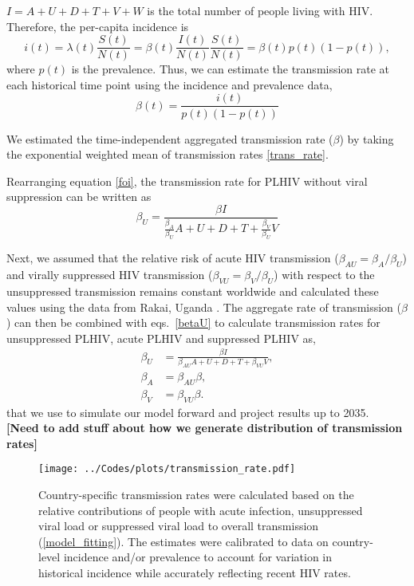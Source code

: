 \documentclass{article}
\newcommand{\comment}[1]{\textbf{[#1]}}
\begin{document}
$I = A+U+D+T+V+W$ is the total number of people living with HIV. Therefore, the per-capita
incidence is
\begin{equation}
i(t) = \lambda(t) \frac{S(t)}{N(t)}
= \beta(t) \frac{I(t)}{N(t)} \frac{S(t)}{N(t)} =\beta(t) p(t) (1-p(t)),
\end{equation}
where $p(t)$ is the prevalence. Thus, we can estimate the
transmission rate at each historical time point using the incidence
and prevalence data,
\begin{equation}
  \label{trans_rate}
  \beta(t) = \frac{i(t)}{p(t)(1-p(t))}
\end{equation}


We estimated the time-independent aggregated transmission rate ($\beta$)
by taking the exponential weighted mean of transmission rates
\eqref{trans_rate}.


Rearranging equation \eqref{foi}, the transmission rate for PLHIV
without viral suppression can be written as
\begin{equation}
\label{betaU}
  \beta_{U} = \frac{\beta I}{\frac{\beta_{A}}{\beta_{U}}A +
    U+D+T+\frac{\beta_{V}}{\beta_{U}}V}
\end{equation}


Next, we assumed that the relative risk of acute HIV transmission
($\beta_{AU} = \beta_{A}/\beta_{U}$) and virally suppressed HIV
transmission ($\beta_{VU} = \beta_{V}/\beta_{U}$) with respect to the
unsuppressed transmission remains constant worldwide and calculated
these values using the data from Rakai, Uganda
\cite{Wawer2005-us}. The aggregate rate of transmission ($\beta$) can
then be combined with eqs.~\eqref{betaU} to calculate transmission
rates for unsuppressed PLHIV, acute PLHIV and suppressed PLHIV as,
\begin{align}
  \beta_{U} & = \frac{\beta I}{\beta_{AU}A +
              U+D+T+\beta_{VU}V}, \\
  \beta_{A} & = \beta_{AU}\beta, \\
  \beta_{V} & = \beta_{VU} \beta.
\end{align}
that we use to simulate our model forward and project results up to 2035.
\\

\comment{Need to add stuff about how we generate distribution of
  transmission rates}




\begin{figure}
  \centering
  \texttt{[image: ../Codes/plots/transmission\_rate.pdf]}
  \caption{Country-specific transmission rates were calculated based
    on the relative contributions of people with acute infection,
    unsuppressed viral load or suppressed viral load to overall
    transmission (\autoref{model_fitting}). The estimates were
    calibrated to data on country-level incidence and/or prevalence to
    account for variation in historical incidence while accurately
    reflecting recent HIV rates.}
  \label{transmission_rate}
\end{figure}
\end{document}
